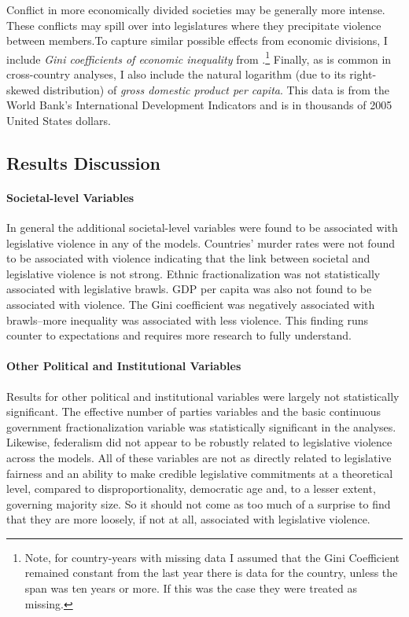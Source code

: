 \documentclass[a4paper]{article}\usepackage[]{graphicx}\usepackage[]{color}
\begin{document}
Conflict in more economically divided societies may be generally more intense. These conflicts may spill over into legislatures where they precipitate violence between members.To capture similar possible effects from economic divisions, I include {\emph{Gini coefficients of economic inequality}} from \cite{UNU2008}.\footnote{Note, for country-years with missing data I assumed that the Gini Coefficient remained constant from the last year there is data for the country, unless the span was ten years or more. If this was the case they were treated as missing.} Finally, as is common in cross-country analyses, I also include the natural logarithm (due to its right-skewed distribution) of {\emph{gross domestic product per capita}}. This data is from the World Bank's International Development Indicators \citeyearpar{WorldBank2011} and is in thousands of 2005 United States dollars.

\subsection*{Results Discussion}


\paragraph{Societal-level Variables}

In general the additional societal-level variables were found to be associated with legislative violence in any of the models. Countries' murder rates were not found to be associated with violence indicating that the link between societal and legislative violence is not strong. Ethnic fractionalization was not statistically associated with legislative brawls. GDP per capita was also not found to be associated with violence. The Gini coefficient was negatively associated with brawls--more inequality was associated with less violence. This finding runs counter to expectations and requires more research to fully understand.

\paragraph{Other Political and Institutional Variables}

Results for other political and institutional variables were largely not statistically significant. The effective number of parties variables and the basic continuous government fractionalization variable was statistically significant in the analyses. Likewise, federalism did not appear to be robustly related to legislative violence across the models. All of these variables are not as directly related to legislative fairness and an ability to make credible legislative commitments at a theoretical level, compared to disproportionality, democratic age and, to a lesser extent, governing majority size. So it should not come as too much of a surprise to find that they are more loosely, if not at all, associated with legislative violence.
\end{document}
